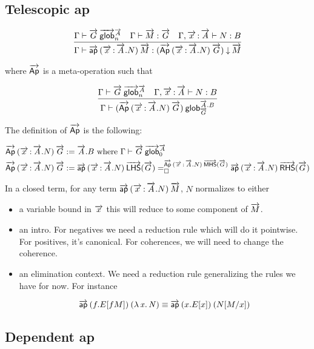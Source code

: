 \subsection{Telescopic ap}

\begin{small}
  \[\infer{\ofdepglob{\Gamma}{\aptel{(\teltm xA.N)}{\tel M}}
    {(\Aptel{(\teltm xA.N)}{\tel G})}{\tel M}}
  {\wfglob{\Gamma}{\tel G}{\tel A}n
    & \ofglob{\Gamma}{\tel M}{\tel G}
    & \ofglob{\Gamma,\teltm xA}{N}{B}}\]

  where $\overrightarrow{\mathsf{Ap}}$ is a meta-operation such that

  \[\infer{\wfdepglob{\Gamma}{(\Aptel{(\teltm xA.N)}{\tel G})}
    {\tel A.B}{\tel G}}
  {\wfglob{\Gamma}{\tel G}{\tel A}n
    & \ofglob{\Gamma,\teltm xA}{N}{B}}\]

  The definition of $\overrightarrow{\mathsf{Ap}}$ is the following:

\[\begin{aligned}
  \overrightarrow{\mathsf{Ap}} \: {(\overrightarrow{x}\, {:}\, \overrightarrow{A}.N)} \: {\overrightarrow{G}} & := \overrightarrow{A}.B
  \text{ where ${\Gamma} \vdash {\ensuremath{\overrightarrow{G}}} \: \overrightarrow{\mathsf{glob}}^{\overrightarrow{A}}_{0}$} \\
  \overrightarrow{\mathsf{Ap}} \: {(\overrightarrow{x}\, {:}\, \overrightarrow{A}.N)} \: {\overrightarrow{G}} & := 
    \overrightarrow{\mathsf{ap}} \: {(\overrightarrow{x}\, {:}\, \overrightarrow{A}.N)} \: {\overrightarrow{\mathsf{LHS}}(\overrightarrow{G})} =^{\overrightarrow{\mathsf{Ap}} \: {(\overrightarrow{x}\, {:}\, \overrightarrow{A}.N)} \: {\overrightarrow{\mathsf{MHS}}(\overrightarrow{G})}}_{\square} \overrightarrow{\mathsf{ap}} \: {(\overrightarrow{x}\, {:}\, \overrightarrow{A}.N)} \: {\overrightarrow{\mathsf{RHS}}(\overrightarrow{G})}
\end{aligned}\]
\end{small}

In a closed term, for any term $\overrightarrow{\mathsf{ap}} \: {(\overrightarrow{x}\, {:}\, \overrightarrow{A}.N)} \: {\overrightarrow{M}}$, $N$ normalizes to
either
\begin{itemize}
\item a variable bound in $\overrightarrow{x}$ this will reduce to some component of
  $\overrightarrow{M}$.
\item an intro. For negatives we
  need a reduction rule which will do it pointwise. For positives, it’s
  canonical. For coherences, we will need to change the coherence.
\item an elimination context. We need a reduction rule generalizing the rules we
  have for now. For instance

\[\overrightarrow{\mathsf{ap}} \: {(f.E[f M])} \: {(\mathit{\lambda\,x.\,N})} \equiv \overrightarrow{\mathsf{ap}} \: {(x.E[x])} \: {(N [ M / x])}\]
\end{itemize}


\subsection{Dependent ap}

